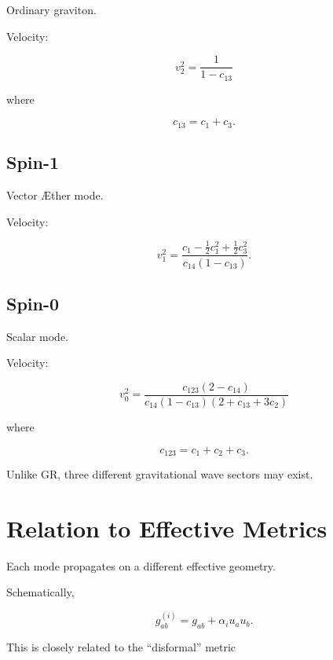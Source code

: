 \documentclass[11pt,a4paper]{article}
\begin{document}
Ordinary graviton.

Velocity:

\begin{equation}
v_2^2
=
\frac{1}{1-c_{13}}
\end{equation}

where

\begin{equation}
c_{13}=c_1+c_3.
\end{equation}

\subsection{Spin-1}

Vector \AE ther mode.

Velocity:

\begin{equation}
v_1^2
=
\frac{
c_1-\frac12 c_1^2+\frac12 c_3^2
}
{
c_{14}(1-c_{13})
}.
\end{equation}

\subsection{Spin-0}

Scalar mode.

Velocity:

\begin{equation}
v_0^2
=
\frac{
c_{123}(2-c_{14})
}{
c_{14}(1-c_{13})(2+c_{13}+3c_2)
}
\end{equation}

where

\begin{equation}
c_{123}=c_1+c_2+c_3.
\end{equation}

Unlike GR, three different gravitational wave sectors may exist.

\section{Relation to Effective Metrics}

Each mode propagates on a different effective geometry.

Schematically,

\begin{equation}
g^{(i)}_{ab}
=
g_{ab}
+
\alpha_i u_a u_b .
\end{equation}

This is closely related to the ``disformal'' metric
\end{document}
